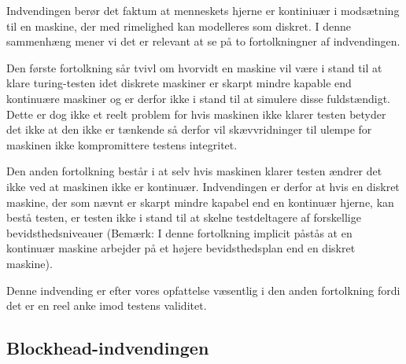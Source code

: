 \documentclass{article}
\begin{document}
Indvendingen berør det faktum at menneskets hjerne er kontiniuær i modsætning til en maskine, der med rimelighed kan modelleres som diskret. I denne sammenhæng mener vi det er relevant at se på to fortolkningner af indvendingen.

Den første fortolkning sår tvivl om hvorvidt en maskine vil være i stand til at klare turing-testen idet diskrete maskiner er skarpt mindre kapable end kontinuære maskiner og er derfor ikke i stand til at simulere disse fuldstændigt. Dette er dog ikke et reelt problem for hvis maskinen ikke klarer testen betyder det ikke at den ikke er tænkende så derfor vil skævvridninger til ulempe for maskinen ikke kompromittere testens integritet.

Den anden fortolkning består i at selv hvis maskinen klarer testen ændrer det ikke ved at maskinen ikke er kontinuær. Indvendingen er derfor at hvis en diskret maskine, der som nævnt er skarpt mindre kapabel end en kontinuær hjerne, kan bestå testen, er testen ikke i stand til at skelne testdeltagere af forskellige bevidsthedsniveauer (Bemærk: I denne fortolkning implicit påstås at en kontinuær maskine arbejder på et højere bevidsthedsplan end en diskret maskine).

Denne indvending er efter vores opfattelse væsentlig i den anden fortolkning fordi det er en reel anke imod testens validitet.


\subsection{Blockhead-indvendingen}
\end{document}
